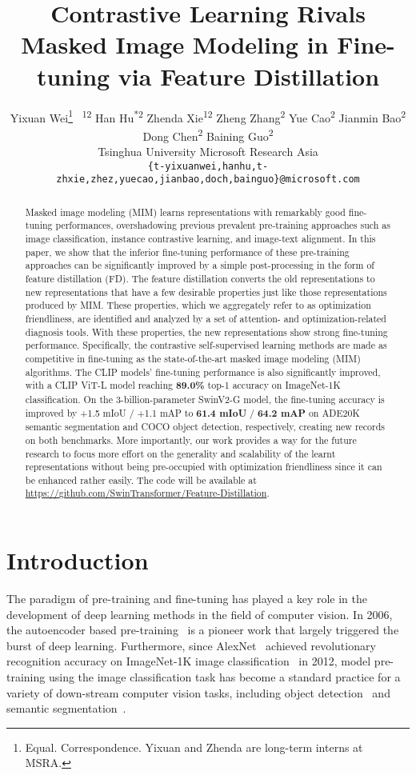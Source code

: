 \documentclass{article}
\title{Contrastive Learning Rivals Masked Image Modeling in Fine-tuning via Feature Distillation}
\author{Yixuan Wei\thanks{Equal. Correspondence. Yixuan and Zhenda are long-term interns at MSRA.}\textsuperscript{~~12} \quad Han Hu\textsuperscript{*2} \quad Zhenda Xie\textsuperscript{12} \quad Zheng Zhang\textsuperscript{2} \NewAnd Yue Cao\textsuperscript{2} \quad Jianmin Bao\textsuperscript{2} \quad Dong Chen\textsuperscript{2} \quad Baining Guo\textsuperscript{2} \\
  Tsinghua University \quad 
  Microsoft Research Asia\\
  \texttt{\{t-yixuanwei,hanhu,t-zhxie,zhez,yuecao,jianbao,doch,bainguo\}@microsoft.com} \\
}
\begin{document}
\maketitle

\begin{abstract}

Masked image modeling (MIM) learns representations with remarkably good fine-tuning performances, overshadowing previous prevalent pre-training approaches such as image classification, instance contrastive learning, and image-text alignment. In this paper, we show that the inferior fine-tuning performance of these pre-training approaches can be significantly improved by a simple post-processing in the form of feature distillation (FD). The feature distillation converts the old representations to new representations that have a few desirable properties just like those representations produced by MIM. These properties, which we aggregately refer to as optimization friendliness, are identified and analyzed by a set of attention- and optimization-related diagnosis tools. With these properties, the new representations show strong fine-tuning performance. Specifically, the contrastive self-supervised learning methods are made as competitive in fine-tuning as the state-of-the-art masked image modeling (MIM) algorithms. The CLIP models' fine-tuning performance is also significantly improved, with a CLIP ViT-L model reaching \textbf{89.0\%} top-1 accuracy on ImageNet-1K classification. On the 3-billion-parameter SwinV2-G model, the fine-tuning accuracy is improved by +1.5 mIoU / +1.1 mAP to \textbf{61.4 mIoU} / \textbf{64.2 mAP} on ADE20K semantic segmentation and COCO object detection, respectively, creating new records on both benchmarks. More importantly, our work provides a way for the future research to focus more effort on the generality and scalability of the learnt representations without being pre-occupied with optimization friendliness since it can be enhanced rather easily. The code will be available at \url{https://github.com/SwinTransformer/Feature-Distillation}.

\end{abstract}


\section{Introduction}

The paradigm of pre-training and fine-tuning has played a key role in the development of deep learning methods in the field of computer vision. In 2006, the autoencoder based pre-training~\cite{HinSal06} is a pioneer work that largely triggered the burst of deep learning. Furthermore, since AlexNet~\cite{alexnet} achieved revolutionary recognition accuracy on ImageNet-1K image classification~\cite{deng2009imagenet} in 2012, model pre-training using the image classification task has become a standard practice for a variety of down-stream computer vision tasks, including object detection~\cite{rcnn13} and semantic segmentation~\cite{long2015fully}.
\end{document}

